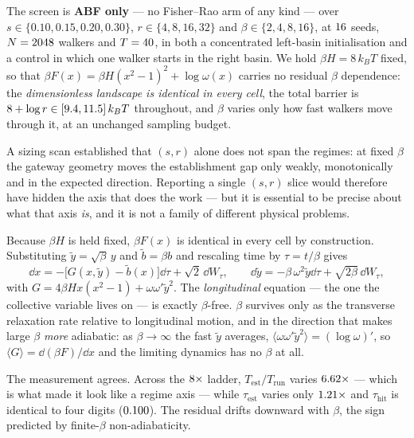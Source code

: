 The screen is \textbf{ABF only} --- no Fisher--Rao arm of any kind --- over
$s \in \{0.10,0.15,0.20,0.30\}$, $r \in \{4,8,16,32\}$ and
$\beta \in \{2,4,8,16\}$, at $16$ seeds, $N=2048$ walkers and $T=40$, in
both a concentrated left-basin initialisation and a control in which one walker starts in
the right basin. We hold $\beta H = 8\,k_BT$ fixed, so that
$\beta F(x) = \beta H (x^2-1)^2 + \log\omega(x)$ carries no residual $\beta$ dependence: the
\emph{dimensionless landscape is identical in every cell}, the total barrier is
$8 + \log r \in [9.4, 11.5]\,k_BT$ throughout, and $\beta$ varies only how
fast walkers move through it, at an unchanged sampling budget.

\begin{remark}
\label{rem:gw_beta}
A sizing scan established that $(s,r)$ alone does not span the regimes: at fixed $\beta$ the
gateway geometry moves the establishment gap only weakly, monotonically and in the expected
direction. Reporting a single $(s,r)$ slice would therefore have hidden the axis that does
the work --- but it is essential to be precise about what that axis \emph{is}, and it is not
a family of different physical problems.

Because $\beta H$ is held fixed, $\beta F(x)$ is identical in every cell by construction.
Substituting $\tilde y = \sqrt{\beta}\,y$ and $\tilde b = \beta b$ and rescaling time by
$\tau = t/\beta$ gives
\begin{equation}
  \dd x = -\big[G(x,\tilde y) - \tilde b(x)\big]\dd\tau + \sqrt2\,\dd W_\tau,
  \qquad
  \dd\tilde y = -\beta\,\omega^2 \tilde y \dd\tau + \sqrt{2\beta}\,\dd W_\tau,
  \label{eq:gw_rescale}
\end{equation}
with $G = 4\beta H x(x^2-1) + \omega\omega'\tilde y^2$. The \emph{longitudinal} equation ---
the one the collective variable lives on --- is exactly $\beta$-free. $\beta$ survives only
as the transverse relaxation rate relative to longitudinal motion, and in the direction that
makes large $\beta$ \emph{more} adiabatic: as $\beta\to\infty$ the fast $\tilde y$ averages,
$\langle\omega\omega'\tilde y^2\rangle = (\log\omega)'$, so
$\langle G\rangle = \dd(\beta F)/\dd x$ and the limiting dynamics has no $\beta$ at all.

The measurement agrees. Across the $8\times$ ladder, $T_{\mathrm{est}}/T_{\mathrm{run}}$
varies $6.62\times$ --- which is what made it look like a regime axis --- while
$\tau_{\mathrm{est}}$ varies only $1.21\times$ and $\tau_{\mathrm{hit}}$ is identical
to four digits ($0.100$). The residual drifts downward with $\beta$, the sign predicted by
finite-$\beta$ non-adiabaticity.


\end{remark}
